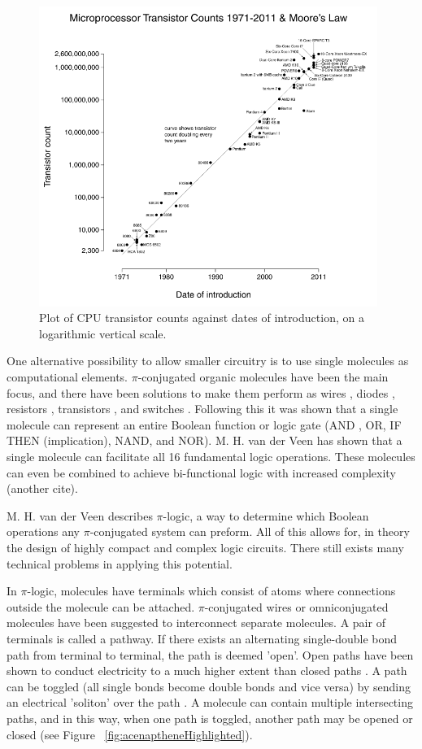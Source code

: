 \documentclass[12pt]{article}
\begin{document}
\begin{figure}[ht!]
\centering
\includegraphics[width=110mm]{MooresLaw.png}
\caption{Plot of CPU transistor counts against dates of introduction, on a logarithmic vertical scale.}
\label{fig:MooresLaw}
\end{figure}

One alternative possibility to allow smaller circuitry is to use single molecules as computational elements. $\pi$-conjugated organic molecules have been the main focus, and there have been solutions to make them perform as wires \cite{9}, diodes \cite{10,11}, resistors \cite{12,13}, transistors \cite{14, 15, 16, 17}, and switches \cite{18, 19}. Following this it was shown that a single molecule can represent an entire Boolean function or logic gate (AND\cite{20} , OR\cite{21}, IF THEN (implication)\cite{22}, NAND\cite{23}, and NOR\cite{24}). M. H.  van der Veen \cite{v06} has shown that a single molecule can facilitate all 16 fundamental logic operations. These molecules can even be combined to achieve bi-functional logic with increased complexity (another cite).

M. H. van der Veen \cite{v06} describes $\pi$-logic, a way to determine which Boolean operations any $\pi$-conjugated system can preform. All of this allows for, in theory the design of highly compact and complex logic circuits. There still exists many technical problems in applying this potential.

In $\pi$-logic, molecules have terminals which consist of atoms where connections outside the molecule can be attached. $\pi$-conjugated wires \cite{9} or omniconjugated molecules \cite{OmniConj} have been suggested to interconnect separate molecules. A pair of terminals is called a pathway. If there exists an alternating single-double bond path from terminal to terminal, the path is deemed 'open'. Open paths have been shown to conduct electricity to a much higher extent than closed paths \cite{openPath}. A path can be toggled (all single bonds become double bonds and vice versa) by sending an electrical 'soliton' over the path \cite{HK88}. A molecule can contain multiple intersecting paths, and in this way, when one path is toggled, another path may be opened or closed (see Figure ~\ref{fig:acenaptheneHighlighted}).
\end{document}
